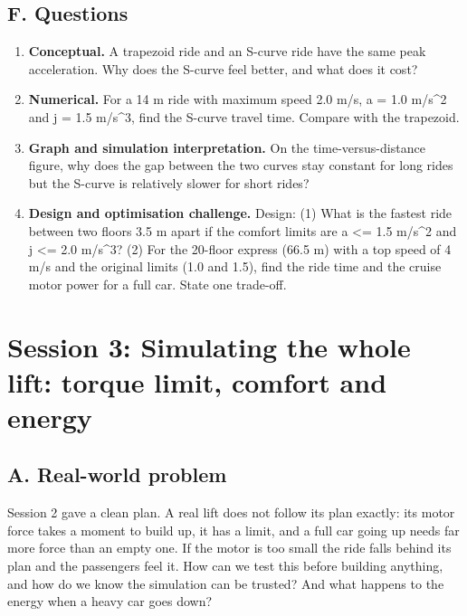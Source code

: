 \documentclass[11pt,a4paper]{article}
\begin{document}
\subsection*{F. Questions}
\begin{enumerate}[nosep]
\item \textbf{Conceptual.} A trapezoid ride and an S-curve ride have the same peak acceleration. Why does the S-curve feel better, and what does it cost?
\item \textbf{Numerical.} For a 14 m ride with maximum speed 2.0 m/s, a = 1.0 m/s\textasciicircum{}2 and j = 1.5 m/s\textasciicircum{}3, find the S-curve travel time. Compare with the trapezoid.
\item \textbf{Graph and simulation interpretation.} On the time-versus-distance figure, why does the gap between the two curves stay constant for long rides but the S-curve is relatively slower for short rides?
\item \textbf{Design and optimisation challenge.} Design: (1) What is the fastest ride between two floors 3.5 m apart if the comfort limits are a \textless{}= 1.5 m/s\textasciicircum{}2 and j \textless{}= 2.0 m/s\textasciicircum{}3? (2) For the 20-floor express (66.5 m) with a top speed of 4 m/s and the original limits (1.0 and 1.5), find the ride time and the cruise motor power for a full car. State one trade-off.
\end{enumerate}

\section{Session 3: Simulating the whole lift: torque limit, comfort and energy}

\subsection*{A. Real-world problem}
Session 2 gave a clean plan. A real lift does not follow its plan exactly: its motor force takes a moment to build up, it has a limit, and a full car going up needs far more force than an empty one. If the motor is too small the ride falls behind its plan and the passengers feel it. How can we test this before building anything, and how do we know the simulation can be trusted? And what happens to the energy when a heavy car goes down?
\end{document}
